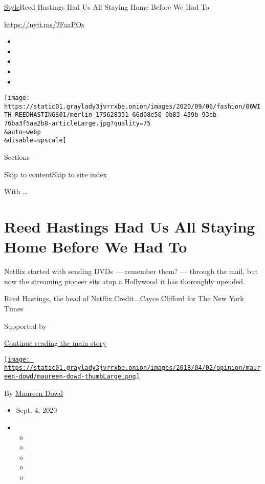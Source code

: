 \href{/section/style}{Style}\textbar{}Reed Hastings Had Us All Staying
Home Before We Had To

\url{https://nyti.ms/2FaaPOs}

\begin{itemize}
\item
\item
\item
\item
\item
\end{itemize}

\texttt{[image: https://static01.graylady3jvrrxbe.onion/images/2020/09/06/fashion/06WITH-REEDHASTINGS01/merlin\_175628331\_66d08e50-0b83-459b-93eb-76ba3f5aa2b8-articleLarge.jpg?quality=75\\\&auto=webp\\\&disable=upscale]}

Sections

\protect\hyperlink{site-content}{Skip to
content}\protect\hyperlink{site-index}{Skip to site index}

With \ldots{}

\hypertarget{reed-hastings-had-us-all-staying-home-before-we-had-to}{%
\section{Reed Hastings Had Us All Staying Home Before We Had
To}\label{reed-hastings-had-us-all-staying-home-before-we-had-to}}

Netflix started with sending DVDs --- remember them? --- through the
mail, but now the streaming pioneer sits atop a Hollywood it has
thoroughly upended.

Reed Hastings, the head of Netflix.Credit...Cayce Clifford for The New
York Times

Supported by

\protect\hyperlink{after-sponsor}{Continue reading the main story}

\href{https://www.nytimes3xbfgragh.onion/by/maureen-dowd}{\texttt{[image: https://static01.graylady3jvrrxbe.onion/images/2018/04/02/opinion/maureen-dowd/maureen-dowd-thumbLarge.png]}}

By \href{https://www.nytimes3xbfgragh.onion/by/maureen-dowd}{Maureen
Dowd}

\begin{itemize}
\item
  Sept. 4, 2020
\item
  \begin{itemize}
  \item
  \item
  \item
  \item
  \item
  \end{itemize}
\end{itemize}

